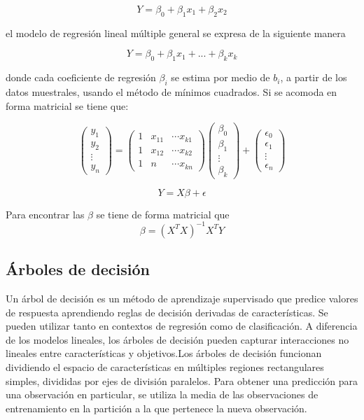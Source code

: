 \documentclass[conference]{IEEEtran}
\begin{document}
\begin{equation}
Y= \beta_0 + \beta_1x_1 + \beta_2x_2
\end{equation}

el modelo de regresión lineal múltiple general se expresa de la siguiente manera 


\begin{equation}
Y= \beta_0 + \beta_1x_1 + ... + \beta_kx_k
\end{equation}

donde cada coeficiente de regresión $\beta_i$ se estima por medio de $b_i$, a partir de los datos muestrales, usando el método de mínimos cuadrados. Si se acomoda en forma matricial se tiene que:

\begin{equation}
\begin{pmatrix}
y_1 \\
y_2 \\
\vdots \\
y_n 
\end{pmatrix}
=
\begin{pmatrix}
1 & x_{11} & \dotsi x_{k1}\\
1 & x_{12} & \dotsi x_{k2}\\
1 & n & \dotsi x_{kn}
\end{pmatrix}
\begin{pmatrix}
\beta_0 \\
\beta_1 \\
\vdots \\
\beta_k
\end{pmatrix}
+
\begin{pmatrix}
\epsilon_0 \\
\epsilon_1 \\
\vdots \\
\epsilon_n
\end{pmatrix}
\end{equation}

\begin{equation}
Y=X\beta+\epsilon
\end{equation}

Para encontrar las $\beta$ se tiene de forma matricial que
\begin{equation}
\beta=(X^TX)^{-1}X^TY
\end{equation}

\subsection{Árboles de decisión}
Un árbol de decisión es un método de aprendizaje supervisado que predice valores de respuesta aprendiendo reglas de decisión derivadas de características. Se pueden utilizar tanto en contextos de regresión como de clasificación. A diferencia de los modelos lineales, los árboles de decisión pueden capturar interacciones no lineales entre características y objetivos.Los árboles de decisión funcionan dividiendo el espacio de características en múltiples regiones rectangulares simples, divididas por ejes de división paralelos. Para obtener una predicción para una observación en particular, se utiliza la media de las observaciones de entrenamiento en la partición a la que pertenece la nueva observación.
\end{document}
